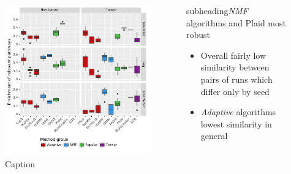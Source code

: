 \documentclass[xcolor=table,final]{beamer}
\newlength{\onecolwid}
\newlength{\twocolwid}
\newcommand{\kcnsubheading}[1]{\begin{beamercolorbox}[rounded=true]{subheading}{\large #1}\end{beamercolorbox}}
\begin{document}
\begin{frame}[t]
\begin{columns}[t]
\begin{column}{\twocolwid}
\begin{columns}
\begin{column}{\onecolwid}
\begin{figure}
\includegraphics[width=0.9 \textwidth]{plots/compare_samegenes_K_50_datasets_ko_traits_nz_alpha_0-05.pdf}
\caption{Caption}
\end{figure}

\end{column} %

\begin{column}{\onecolwid} %

\kcnsubheading{\textit{NMF} algorithms and Plaid most robust}

\begin{itemize}
    \item Overall fairly low similarity between pairs of runs which differ only by seed
    \item \textit{Adaptive} algorithms lowest similarity in general
\end{itemize}


\end{column}
\end{columns}
\end{column}
\end{columns}
\end{frame}
\end{document}

